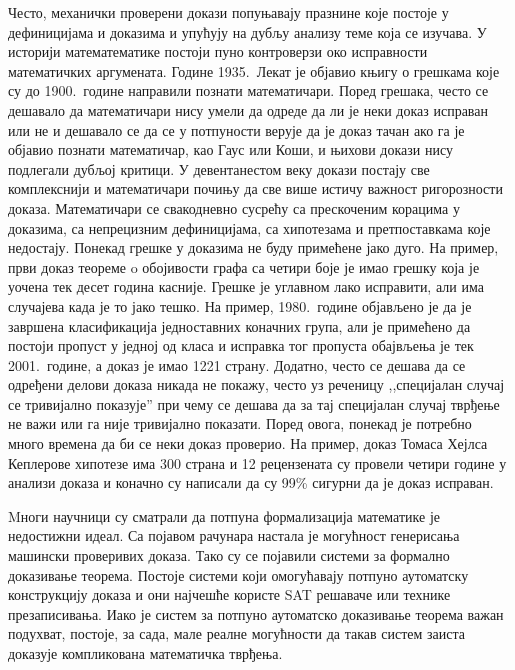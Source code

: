\documentclass[11pt]{article}
\begin{document}
Често, механички проверени докази попуњавају празнине које постоје у
дефиницијама и доказима и упућују на дубљу анализу теме која се
изучава. У историји математематике постоји пуно контроверзи око
исправности математичких аргумената. Године 1935.~Лекат је објавио
књигу о грешкама које су до 1900.~године направили познати
математичари. Поред грешака, често се дешавало да математичари нису умели
да одреде да ли је неки доказ исправан или не и дешавало се да
се у потпуности верује да је доказ тачан ако га је објавио познати
математичар, као Гаус или Коши, и њихови докази нису подлегали дубљој
критици. У девентанестом веку докази постају све комплекснији и
математичари почињу да све више истичу важност ригорозности
доказа. Математичари се свакодневно сусрећу са прескоченим корацима у
доказима, са непрецизним дефиницијама, са хипотезама и претпоставкама
које недостају. Понекад грешке у доказима не буду примећене јако
дуго. На пример, први доказ теореме o обојивости графа са четири боје
је имао грешку која је уочена тек десет година касније. Грешке је
углавном лако исправити, али има случајева када је то јако тешко. На
пример, 1980.~године објављено је да је завршена класификација
једноставних коначних група, али је примећено да постоји пропуст у
једној од класа и исправка тог пропуста обајвљења је тек
2001.~године, а доказ је имао 1221 страну.  Додатно, често се дешава да
се одређени делови доказа никада не покажу, често уз реченицу
,,специјалан случај се тривијално показује'' при чему се дешава да за
тај специјалан случај тврђење не важи или га није тривијално
показати. Поред овога, понекад је потребно много времена да би се неки
доказ проверио. На пример, доказ Томаса Хејлса Кеплерове хипотезе
има 300 страна и 12 рецензената су провели четири године у анализи
доказа и коначно су написали да су 99\% сигурни да је доказ исправан.

Mноги научници су сматрали да потпуна формализација математике је
недостижни идеал. Са појавом рачунара настала је могућност генерисања машински
проверивих доказа. Тако су се појавили системи за формално доказивање
теорема. Постоје системи који омогућавају потпуно ау\-то\-мат\-ску
конструкцију доказа и они најчешће користе SAT решаваче или технике
презаписивања. Иако је систем за потпуно аутоматско доказивање теорема
важан подухват, постоје, за сада, мале реалне могућности да такав
систем заиста доказује компликована ма\-те\-ма\-ти\-чка тврђења.
\end{document}
